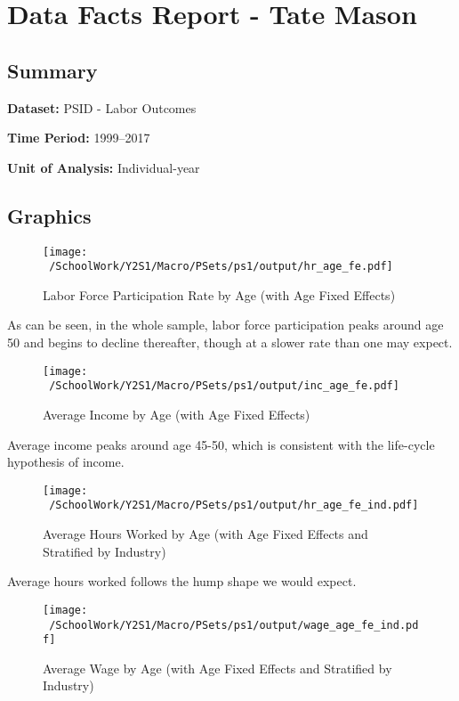 \documentclass[12pt]{article}
\newcommand{\datafact}[2]{%
  \noindent\textbf{#1:} #2 \par
}
\begin{document}
\section*{Data Facts Report - Tate Mason}

\subsection*{Summary}
\datafact{Dataset}{PSID - Labor Outcomes}
\datafact{Time Period}{1999--2017}
\datafact{Unit of Analysis}{Individual-year}

\subsection*{Graphics}
\begin{figure}[h!]
    \centering
    \texttt{[image: ~/SchoolWork/Y2S1/Macro/PSets/ps1/output/hr\_age\_fe.pdf]}
    \caption{Labor Force Participation Rate by Age (with Age Fixed Effects)}
\end{figure}

As can be seen, in the whole sample, labor force participation peaks around age 50 and begins to decline thereafter, though at a slower rate
than one may expect.

\begin{figure}[h!]
    \centering
    \texttt{[image: ~/SchoolWork/Y2S1/Macro/PSets/ps1/output/inc\_age\_fe.pdf]}
    \caption{Average Income by Age (with Age Fixed Effects)}
\end{figure}

Average income peaks around age 45-50, which is consistent with the life-cycle hypothesis of income.

\begin{figure}[h!]
    \centering
    \texttt{[image: ~/SchoolWork/Y2S1/Macro/PSets/ps1/output/hr\_age\_fe\_ind.pdf]}
    \caption{Average Hours Worked by Age (with Age Fixed Effects and Stratified by Industry)}
\end{figure}

Average hours worked follows the hump shape we would expect.

\begin{figure}[h!]
    \centering
    \texttt{[image: ~/SchoolWork/Y2S1/Macro/PSets/ps1/output/wage\_age\_fe\_ind.pdf]}
    \caption{Average Wage by Age (with Age Fixed Effects and Stratified by Industry)}
\end{figure}
\end{document}
